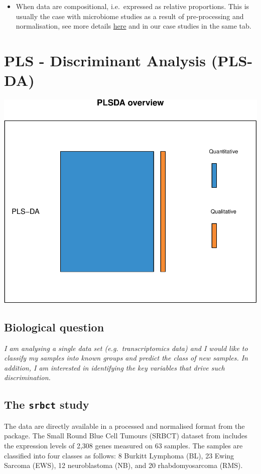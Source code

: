 \documentclass[]{book}
\providecommand{\tightlist}{%
  \setlength{\itemsep}{0pt}\setlength{\parskip}{0pt}}
\begin{document}
\begin{itemize}
  \begin{itemize}
  \tightlist
  \item
    When data are compositional, i.e.~expressed as relative proportions. This is usually the case with microbiome studies as a result of pre-processing and normalisation, see more details \href{http://mixomics.org/mixmc/}{here} and in our case studies in the same tab.
  \end{itemize}
\end{itemize}

\hypertarget{plsda}{%
\chapter{PLS - Discriminant Analysis (PLS-DA)}\label{plsda}}

\begin{center}\includegraphics[width=0.5\linewidth]{Figures/04-overview-PLSDA-1} \end{center}

\hypertarget{biological-question-2}{%
\section{Biological question}\label{biological-question-2}}

{
\emph{I am analysing a single data set (e.g.~transcriptomics data) and I would like to classify my samples into known groups and predict the class of new samples. In addition, I am interested in identifying the key variables that drive such discrimination.}
}

\hypertarget{the-srbct-study}{%
\section{\texorpdfstring{The \texttt{srbct} study}{The srbct study}}\label{the-srbct-study}}

The data are directly available in a processed and normalised format from the package. The Small Round Blue Cell Tumours (SRBCT) dataset from \citep{Kha01} includes the expression levels of 2,308 genes measured on 63 samples. The samples are classified into four classes as follows: 8 Burkitt Lymphoma (BL), 23 Ewing Sarcoma (EWS), 12 neuroblastoma (NB), and 20 rhabdomyosarcoma (RMS).
\end{document}
